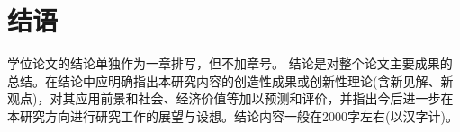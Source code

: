 
\section{结语}
\label{section:conclusion}
学位论文的结论单独作为一章排写，但不加章号。
结论是对整个论文主要成果的总结。在结论中应明确指出本研究内容的创造性成果或创新性理论(含新见解、新观点)，对其应用前景和社会、经济价值等加以预测和评价，并指出今后进一步在本研究方向进行研究工作的展望与设想。结论内容一般在2000字左右(以汉字计)。